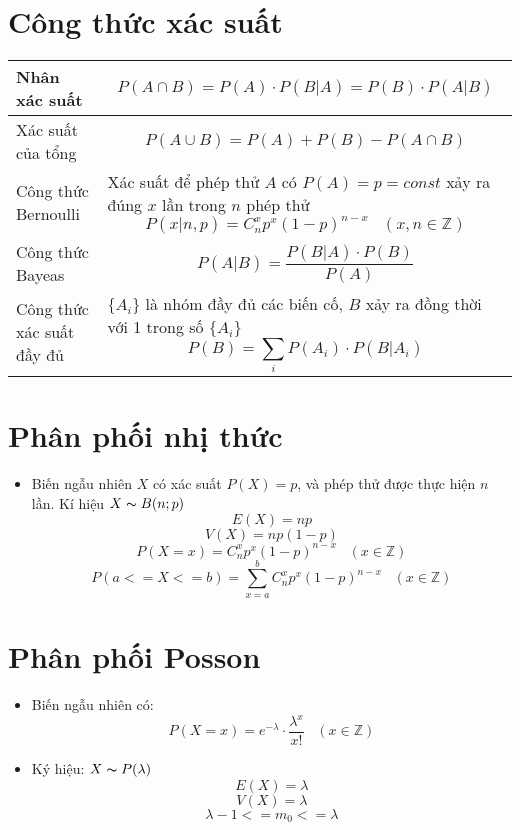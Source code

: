 \documentclass[utf8,a4paper]{article}
\begin{document}
\section[]{Công thức xác suất}
\begin{center}
  \begin{tabularx}{11.9cm} {
    | >{\centering\arraybackslash} m{3cm}
    | >{\centering\arraybackslash} m{8cm} | }
    \hline
      Nhân xác suất &
      \[P(A \cap B) = P(A) \cdot P(B | A) = P(B) \cdot P(A | B)\] \\
    \hline
      Xác suất của tổng&
      \[P(A \cup B) = P(A) + P(B) - P(A \cap B)\]\\
    \hline
      Công thức Bernoulli &
      Xác suất để phép thử \(A\) có \(P(A) = p = const\) xảy ra đúng \(x\) lần trong \(n\) phép thử
      \[P(x | n, p) = {C}^{x}_{n}{p}^{x}{(1 - p)}^{n - x} \;\;\; (x,n \in \mathbb{Z})\] \\
    \hline
      Công thức Bayeas &
      \[P(A | B) = \frac{P(B | A) \cdot P(B)}{P(A)}\] \\
    \hline
      Công thức xác suất đầy đủ &
      \(\{{A}_{i}\}\) là nhóm đầy đủ các biến cố, \(B\) xảy ra đồng thời với 1 trong số \(\{{A}_{i}\}\)
      \[P(B) = \sum_{i}{P({A}_{i}) \cdot P(B | {A}_{i})}\] \\
    \hline
  \end{tabularx}
\end{center}

\section[]{Phân phối nhị thức}
\begin{itemize}
  \item Biến ngẫu nhiên \(X\) có xác suất \(P(X) = p\), và phép thử được thực hiện \(n\) lần. Kí hiệu \(X \thicksim B(n; p)\)
    \[E(X) = np\]
    \[V(X) = np(1 - p)\]
    \[P(X = x) = {C}^{x}_{n}{p}^{x}{(1 - p)}^{n - x} \;\;\; (x \in \mathbb{Z})\]
    \[P(a <= X <= b) = \sum^{b}_{x = a}{{C}^{x}_{n}{p}^{x}{(1 - p)}^{n - x}} \;\;\; (x \in \mathbb{Z})\]
\end{itemize}

\section[]{Phân phối Posson}
\begin{itemize}
  \item Biến ngẫu nhiên có:
    \[P(X = x) = {e}^{- \lambda} \cdot \frac{{\lambda}^{x}}{x!} \;\;\; (x \in \mathbb{Z})\]
  \item Ký hiệu: \(X \thicksim P(\lambda)\)
    \[E(X) = \lambda\]
    \[V(X) = \lambda\]
    \[\lambda - 1 <= {m}_{0} <= \lambda\]

\end{itemize}
\end{document}
